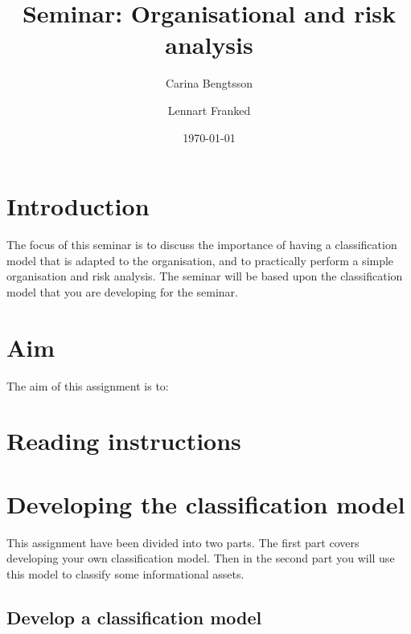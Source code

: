 \documentclass[a4paper]{llncs}
\begin{document}
\title{Seminar: Organisational and risk analysis}
\author{%
  Carina Bengtsson
  \and
  Lennart Franked
}
\date{\today}

\maketitle

\section{Introduction}
\label{sec:introduction}

The focus of this seminar is to discuss the importance of having a
classification model that is adapted to the organisation, and to practically
perform a simple organisation and risk analysis.
The seminar will be based upon the classification model that you are developing
for the seminar.

\section{Aim}
\label{sec:aim}

The aim of this assignment is to:
\begin{itemize}
  
\end{itemize}


\section{Reading instructions}




\section{Developing the classification model}
\label{sec:work}

This assignment have been divided into two parts.
The first part covers developing your own classification model. Then in the
second part you will use this model to classify some informational assets.

\subsection{Develop a classification model}
\label{sec:develop}
\end{document}
